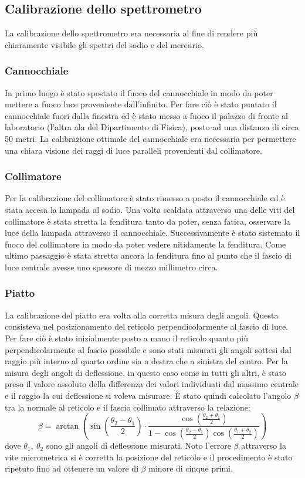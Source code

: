 \documentclass[a4paper,10pt]{article}
\begin{document}
	\subsection{Calibrazione dello spettrometro}
	La calibrazione dello spettrometro era necessaria al fine di rendere più chiaramente visibile gli spettri del sodio e del mercurio. \\
	\subsubsection*{Cannocchiale}
	In primo luogo è stato spostato il fuoco del cannocchiale in modo da poter mettere a fuoco luce proveniente dall'infinito. Per fare ciò è stato puntato il cannocchiale fuori dalla finestra ed è stato messo a fuoco il palazzo di fronte al laboratorio (l'altra ala del Dipartimento di Fisica), posto ad una distanza di circa 50 metri.
	La calibrazione ottimale del cannocchiale era necessaria per permettere una chiara visione dei raggi di luce paralleli provenienti dal collimatore.\\
	\subsubsection*{Collimatore}
	Per la calibrazione del collimatore è stato rimesso a posto il cannocchiale ed è stata accesa la lampada al sodio. Una volta scaldata attraverso una delle viti del collimatore è stata stretta la fenditura tanto da poter, senza fatica, osservare la luce della lampada attraverso il cannocchiale. Successivamente è stato sistemato il fuoco del collimatore in modo da poter vedere nitidamente la fenditura. Come ultimo passaggio è stata stretta ancora la fenditura fino al punto che il fascio di luce centrale avesse uno spessore di mezzo millimetro circa.
	\subsubsection*{Piatto}
	La calibrazione del piatto era volta alla corretta misura degli angoli. Questa consisteva nel posizionamento del reticolo perpendicolarmente al fascio di luce.\\
	Per fare ciò è stato inizialmente posto a mano il reticolo quanto più perpendicolarmente al fascio possibile e sono stati misurati gli angoli sottesi dal raggio più interno al quarto ordine sia a destra che a sinistra del centro. Per la misura degli angoli di deflessione, in questo caso come in tutti gli altri, è stato preso il valore assoluto della differenza dei valori individuati dal massimo centrale e il raggio la cui deflessione si voleva misurare. È stato quindi calcolato l'angolo $ \beta $ tra la normale al reticolo e il fascio collimato attraverso la relazione:
	\[ \beta = \arctan \left( \sin \left( \frac{\theta_2-\theta_1}{2} \right) \cdot \dfrac { \cos \left( \frac{\theta_2 + \theta_1}{2}\right)} {1- \cos \left( \frac{\theta_2-\theta_1}{2} \right) \cos \left( \frac{\theta_1+\theta_2}{2}\right)} \right) \]
	dove $ \theta_1, \ \theta_2 $ sono gli angoli di deflessione misurati. Noto l'errore $ \beta $ attraverso la vite micrometrica si è corretta la posizione del reticolo e il procedimento è stato ripetuto fino ad ottenere un valore di $ \beta $ minore di cinque primi.
\end{document}
